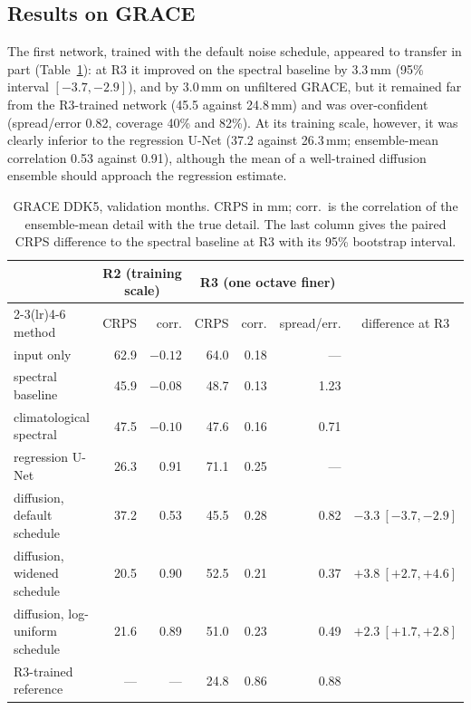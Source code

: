\documentclass[11pt,a4paper]{article}
\begin{document}
\subsection{Results on GRACE}\label{sec:p1diag}
The first network, trained with the default noise schedule, appeared to transfer in part
(Table~\ref{tab:p1}): at R3 it improved on the spectral baseline by 3.3\,mm (95\% interval
$[-3.7, -2.9]$), and by 3.0\,mm on unfiltered GRACE, but it remained far from the R3-trained
network (45.5 against 24.8\,mm) and was over-confident (spread/error 0.82, coverage 40\% and
82\%). At its training scale, however, it was clearly inferior to the regression U-Net (37.2
against 26.3\,mm; ensemble-mean correlation 0.53 against 0.91), although the mean of a
well-trained diffusion ensemble should approach the regression estimate.

\begin{table}[ht]
\centering\small
\caption{GRACE DDK5, validation months. CRPS in mm; corr.\ is the correlation of the
ensemble-mean detail with the true detail. The last column gives the paired CRPS difference to
the spectral baseline at R3 with its 95\% bootstrap interval.}
\label{tab:p1}
\begin{tabular}{lrrrrrc}
  \toprule
  & \multicolumn{2}{c}{R2 (training scale)} & \multicolumn{3}{c}{R3 (one octave finer)} & \\
  \cmidrule(lr){2-3}\cmidrule(lr){4-6}
  method & CRPS & corr. & CRPS & corr. & spread/err. & difference at R3 \\
  \midrule
  input only & 62.9 & $-0.12$ & 64.0 & 0.18 & --- & \\
  spectral baseline & 45.9 & $-0.08$ & 48.7 & 0.13 & 1.23 & \\
  climatological spectral & 47.5 & $-0.10$ & 47.6 & 0.16 & 0.71 & \\
  regression U-Net & 26.3 & 0.91 & 71.1 & 0.25 & --- & \\
  diffusion, default schedule & 37.2 & 0.53 & 45.5 & 0.28 & 0.82 & $-3.3\ [-3.7, -2.9]$ \\
  diffusion, widened schedule & 20.5 & 0.90 & 52.5 & 0.21 & 0.37 & $+3.8\ [+2.7, +4.6]$ \\
  diffusion, log-uniform schedule & 21.6 & 0.89 & 51.0 & 0.23 & 0.49 & $+2.3\ [+1.7, +2.8]$ \\
  \midrule
  R3-trained reference & --- & --- & 24.8 & 0.86 & 0.88 & \\
  \bottomrule
\end{tabular}
\end{table}
\end{document}
